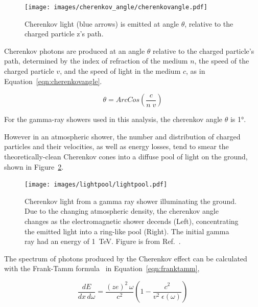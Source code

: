   \begin{figure}[ht]
    \centering
    \texttt{[image: images/cherenkov\_angle/cherenkovangle.pdf]}
    \caption[Chernekov Emission Angle]{
      Cherenkov light (blue arrows) is emitted at angle $\theta$, relative to the charged particle z's path.
    }
    \label{fig:cherenkovangle}
  \end{figure}

  Cherenkov photons are produced at an angle $\theta$ relative to the charged particle's path, determined by the index of refraction of the medium $n$, the speed of the charged particle $v$, and the speed of light in the medium $c$, as in Equation~\ref{eqn:cherenkovangle}.

  \begin{equation}\label{eqn:cherenkovangle}
    \theta = ArcCos \left ( \frac{c}{n \; v} \right )
  \end{equation}
  
  For the gamma-ray showers used in this analysis, the cherenkov angle $\theta$ is \nicetilde\ang{1}.

  However in an atmospheric shower, the number and distribution of charged particles and their velocities, as well as energy losses, tend to smear the theoretically-clean Cherenkov cones into a diffuse pool of light on the ground, shown in Figure~\ref{fig:lightpool}.

  \begin{figure}[ht]
    \centering
    \texttt{[image: images/lightpool/lightpool.pdf]}
    \caption[Chernekov Light Pool]{
      Cherenkov light from a gamma ray shower illuminating the ground.
      Due to the changing atmospheric density, the cherenkov angle changes as the electromagnetic shower decends (Left), concentrating the emitted light into a ring-like pool (Right).
      The initial gamma ray had an energy of \SI{1}{\TeV}.
      Figure is from Ref.~\cite{Voelk}.
    }
    \label{fig:lightpool}
  \end{figure}
  
  The spectrum of photons produced by the Cherenkov effect can be calculated with the Frank-Tamm formula~\cite{franktamm1,franktamm2} in Equation~\ref{eqn:franktamm},
  
  \begin{equation}\label{eqn:franktamm}
    \frac{dE}{dx\,d\omega}=\frac{(ze)^2 \, \omega}{c^2} \left ( 1 - \frac{c^2}{v^2 \;\epsilon(\omega)} \right )
  \end{equation}
  
